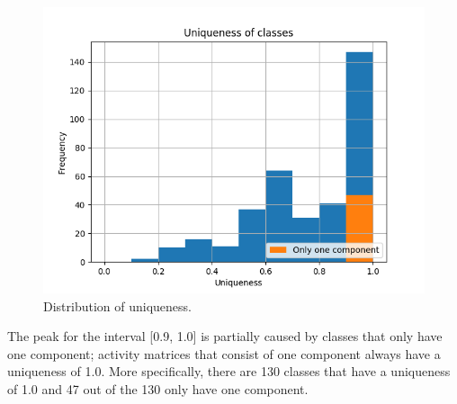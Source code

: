\begin{figure}
    \centering
    \includegraphics[width=\linewidth]{figures/histogram_uniqueness}
    \caption{Distribution of uniqueness.}
    \label{fig:uniqueness}
\end{figure}

The peak for the interval [0.9, 1.0] is partially caused by classes that only have one component; activity matrices that consist of one component always have a uniqueness of 1.0.
More specifically, there are 130 classes that have a uniqueness of 1.0 and 47 out of the 130 only have one component.

